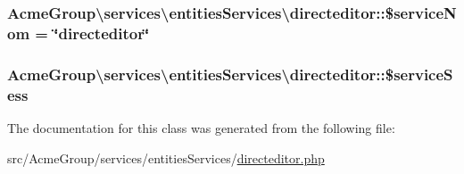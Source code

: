 \hypertarget{class_acme_group_1_1services_1_1entities_services_1_1directeditor_a0d27ebf728708f3bbfb2da96d118f4b5}{
\subsubsection[{\$service\+Nom}]{\setlength{\rightskip}{0pt plus 5cm}Acme\+Group\textbackslash{}services\textbackslash{}entities\+Services\textbackslash{}directeditor\+::\$service\+Nom = \char`\"{}directeditor\char`\"{}\hspace{0.3cm}{\ttfamily [protected]}}}\label{class_acme_group_1_1services_1_1entities_services_1_1directeditor_a0d27ebf728708f3bbfb2da96d118f4b5}
\hypertarget{class_acme_group_1_1services_1_1entities_services_1_1directeditor_a008174fe3f7ac33ca99349efd0ec3efd}{
\subsubsection[{\$service\+Sess}]{\setlength{\rightskip}{0pt plus 5cm}Acme\+Group\textbackslash{}services\textbackslash{}entities\+Services\textbackslash{}directeditor\+::\$service\+Sess\hspace{0.3cm}{\ttfamily [protected]}}}\label{class_acme_group_1_1services_1_1entities_services_1_1directeditor_a008174fe3f7ac33ca99349efd0ec3efd}


The documentation for this class was generated from the following file\+:\begin{DoxyCompactItemize}
\item 
src/\+Acme\+Group/services/entities\+Services/\hyperlink{directeditor_8php}{directeditor.\+php}\end{DoxyCompactItemize}
